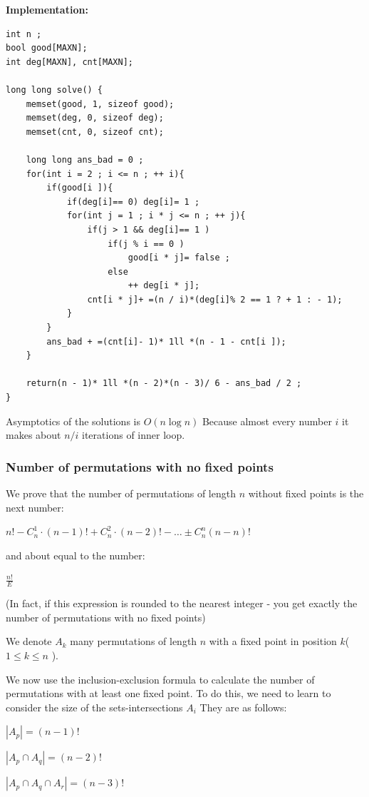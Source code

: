 \textbf{Implementation:}

\begin{verbatim}
int n ;
bool good[MAXN];
int deg[MAXN], cnt[MAXN];
 
long long solve() {
    memset(good, 1, sizeof good);
    memset(deg, 0, sizeof deg);
    memset(cnt, 0, sizeof cnt);
 
    long long ans_bad = 0 ;
    for(int i = 2 ; i <= n ; ++ i){
        if(good[i ]){
            if(deg[i]== 0) deg[i]= 1 ;
            for(int j = 1 ; i * j <= n ; ++ j){
                if(j > 1 && deg[i]== 1 )
                    if(j % i == 0 )
                        good[i * j]= false ;
                    else
                        ++ deg[i * j];
                cnt[i * j]+ =(n / i)*(deg[i]% 2 == 1 ? + 1 : - 1);
            }
        }
        ans_bad + =(cnt[i]- 1)* 1ll *(n - 1 - cnt[i ]);
    }
 
    return(n - 1)* 1ll *(n - 2)*(n - 3)/ 6 - ans_bad / 2 ;
} 
\end{verbatim}
Asymptotics of the solutions is $O (n \log n)$ Because almost every number $i$ it makes about $n / i$ iterations of inner loop.

\subsubsection{ Number of permutations with no fixed points }

We prove that the number of permutations of length $n$ without fixed points is the next number:

$n!-C_{n}^{1}\cdot(n-1)!+C_{n}^{2}\cdot(n-2)!-\ldots\pm C_{n}^{n}(n-n)!$

and about equal to the number:

$\frac {n! } {E}$

(In fact, if this expression is rounded to the nearest integer - you get exactly the number of permutations with no fixed points)

We denote $A_k$ many permutations of length $n$ with a fixed point in position $k$($1 \le k \le n$ ).

We now use the inclusion-exclusion formula to calculate the number of permutations with at least one fixed point. To do this, we need to learn to consider the size of the sets-intersections $A_i$ They are as follows:

$\left | A_p \right | = (n-1)! ~$

$\left | A_p \cap A_q \right | = (n-2)! ~$

$\left | A_p \cap A_q \cap A_r \right | = (n-3)! ~$

